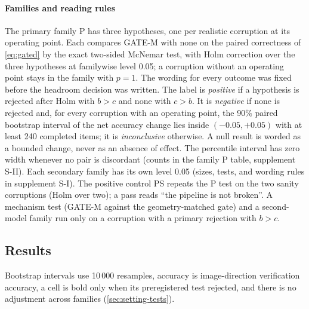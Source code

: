 \paragraph*{Families and reading rules}
The primary family P has three hypotheses, one per realistic corruption at its operating point.
Each compares GATE-M with none on the paired correctness of \cref{eq:gated} by the exact two-sided McNemar test, with Holm correction over
the three hypotheses at familywise level 0.05; a corruption without an operating point stays in the family with $p=1$.
The wording for every outcome was fixed before the headroom decision was written.
The label is \emph{positive} if a hypothesis is rejected after Holm with $b>c$ and none with $c>b$.
It is \emph{negative} if none is rejected and, for every corruption with an operating point, the 90\% paired bootstrap interval of the
net accuracy change lies inside $(-0.05,+0.05)$ with at least 240 completed items; it is \emph{inconclusive} otherwise.
A null result is worded as a bounded change, never as an absence of effect.
The percentile interval has zero width whenever no pair is discordant (counts in the family P table, supplement S-II).
Each secondary family has its own level 0.05 (sizes, tests, and wording rules in supplement S-I).
The positive control PS repeats the P test on the two sanity corruptions (Holm over two); a pass reads ``the pipeline is not broken''.
A mechanism test (GATE-M against the geometry-matched gate) and a second-model family run only on a corruption with a primary rejection
with $b>c$.

\subsection{Results}\label{sec:study1-results}
Bootstrap intervals use 10\,000 resamples, accuracy is image-direction verification accuracy, a cell is bold only when its
preregistered test rejected, and there is no adjustment across families (\cref{sec:setting-tests}).

